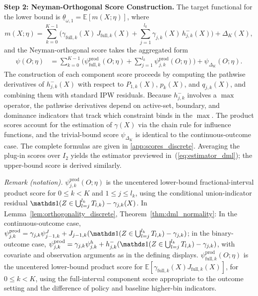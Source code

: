 \textbf{Step 2: Neyman-Orthogonal Score Construction.} The target functional for the lower bound is $\underline{\theta}_{\omega,1} = \mathbb{E}[m(X; \eta)]$, where
\begin{equation*}
    m(X; \eta) = \sum_{k=0}^{K-1}\bigg(\gamma_{\text{full},k}(X)\, J_{\text{full},k}(X) + \sum_{j=1}^{l_k} \gamma_{j,k}(X)\, h_{j,k}^{-}(X)\bigg) + \Delta_K(X),
\end{equation*}
and the Neyman-orthogonal score takes the aggregated form
\begin{align}\label{eq:binary_score}
    \psi(O; \eta) &= \sum_{k=0}^{K-1}\bigg(\psi_{\text{full},k}^{\text{prod}}(O; \eta) + \sum_{j=1}^{l_k} \psi_{j,k}^{\text{prod}}(O; \eta)\bigg) + \psi_{\Delta_K}(O; \eta).
\end{align}
The construction of each component score proceeds by computing the pathwise derivatives of $h_{j,k}^{-}(X)$ with respect to $P_{1,k}(X)$, $p_k(X)$, and $q_{j,k}(X)$, and combining them with standard IPW residuals. Because $h_{j,k}^{-}$ involves a $\max$ operator, the pathwise derivatives depend on active-set, boundary, and dominance indicators that track which constraint binds in the $\max$. The product scores account for the estimation of $\gamma(X)$ via the chain rule for influence functions, and the trivial-bound score $\psi_{\Delta_K}$ is identical to the continuous-outcome case. The complete formulas are given in \cref{app:scores_discrete}. Averaging the plug-in scores over $I_2$ yields the estimator previewed in~(\ref{eq:estimator_dml}); the upper-bound score is derived similarly.

\noindent\textit{Remark (notation).} $\psi_{j,k}^{\text{prod}}(O;\eta)$ is the uncentered lower-bound fractional-interval product score for $0\leq k<K$ and $1\leq j\leq l_k$, using the conditional union-indicator residual $\indicator(Z\in\bigcup_{l=j}^{l_k}T_{l,k})-\gamma_{j,k}(X)$. In Lemma~\ref{lem:orthogonality_discrete}, Theorem~\ref{thm:dml_normality}: In the continuous-outcome case, $\psi_{j,k}^{\text{prod}}=\gamma_{j,k}\psi_{j-1,k}^{J}+J_{j-1,k}(\indicator(Z\in\bigcup_{l=j}^{l_k}T_{l,k})-\gamma_{j,k})$; in the binary-outcome case, $\psi_{j,k}^{\text{prod}}=\gamma_{j,k}\psi_{j,k}^{h}+h_{j,k}^{-}(\indicator(Z\in\bigcup_{l=j}^{l_k}T_{l,k})-\gamma_{j,k})$, with covariate and observation arguments as in the defining displays. $\psi_{\text{full},k}^{\text{prod}}(O;\eta)$ is the uncentered lower-bound product score for $\mathbb E[\gamma_{\text{full},k}(X)J_{\text{full},k}(X)]$, for $0\leq k<K$, using the full-interval component score appropriate to the outcome setting and the difference of policy and baseline higher-bin indicators.


